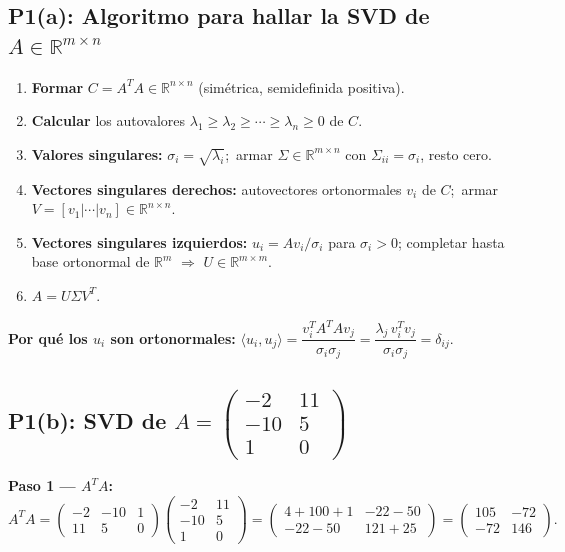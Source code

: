 \documentclass[11pt,a4paper]{article}
\begin{document}
\subsection{P1(a): Algoritmo para hallar la SVD de $A \in \mathbb{R}^{m\times n}$}
\label{sec:parcial2025_p1a}

\begin{enumerate}
  \item \textbf{Formar} $C = A^TA \in \mathbb{R}^{n\times n}$ (simétrica, semidefinida positiva).
  \item \textbf{Calcular} los autovalores $\lambda_1 \ge \lambda_2 \ge \cdots \ge \lambda_n \ge 0$ de $C$.
  \item \textbf{Valores singulares:} $\sigma_i = \sqrt{\lambda_i}$;\,
        armar $\Sigma \in \mathbb{R}^{m\times n}$ con $\Sigma_{ii} = \sigma_i$, resto cero.
  \item \textbf{Vectores singulares derechos:} autovectores ortonormales $v_i$ de $C$;\,
        armar $V = [v_1|\cdots|v_n] \in \mathbb{R}^{n\times n}$.
  \item \textbf{Vectores singulares izquierdos:} $u_i = Av_i/\sigma_i$ para $\sigma_i > 0$;
        completar hasta base ortonormal de $\mathbb{R}^m$ $\Rightarrow$ $U \in \mathbb{R}^{m\times m}$.
  \item $A = U\Sigma V^T$.
\end{enumerate}

\begin{tcolorbox}[clave]
\textbf{Por qué los $u_i$ son ortonormales:}
$\langle u_i,u_j\rangle = \dfrac{v_i^TA^TAv_j}{\sigma_i\sigma_j}
= \dfrac{\lambda_j\,v_i^Tv_j}{\sigma_i\sigma_j} = \delta_{ij}$.
\end{tcolorbox}

\subsection{P1(b): SVD de $A = \begin{pmatrix}-2&11\\-10&5\\1&0\end{pmatrix}$}
\label{sec:parcial2025_p1b}

\textbf{Paso 1 --- $A^TA$:}
\[
  A^TA = \begin{pmatrix}-2&-10&1\\11&5&0\end{pmatrix}
         \begin{pmatrix}-2&11\\-10&5\\1&0\end{pmatrix}
  = \begin{pmatrix}4+100+1 & -22-50\\-22-50 & 121+25\end{pmatrix}
  = \begin{pmatrix}105 & -72\\-72 & 146\end{pmatrix}.
\]
\end{document}
